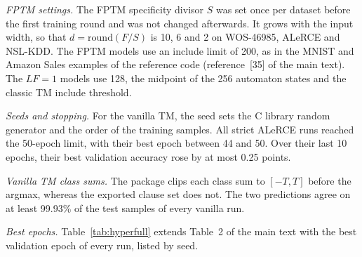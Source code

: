 \documentclass[preprint,12pt]{elsarticle}
\newcommand{\LF}{\mathit{LF}}
\begin{document}
\textit{FPTM settings.} The FPTM specificity divisor $S$ was set once per dataset before the first training round and was not changed afterwards. It grows with the input width, so that $d=\mathrm{round}(F/S)$ is 10, 6 and 2 on WOS-46985, ALeRCE and NSL-KDD.
The FPTM models use an include limit of 200, as in the MNIST and Amazon Sales examples of the reference code (reference~[35] of the main text). The $\LF=1$ models use 128, the midpoint of the 256 automaton states and the classic TM include threshold.

\textit{Seeds and stopping.} For the vanilla TM, the seed sets the C library random generator and the order of the training samples.
All strict ALeRCE runs reached the 50-epoch limit, with their best epoch between 44 and 50. Over their last 10 epochs, their best validation accuracy rose by at most 0.25 points.

\textit{Vanilla TM class sums.} The package clips each class sum to $[-T,T]$ before the argmax, whereas the exported clause set does not. The two predictions agree on at least 99.93\% of the test samples of every vanilla run.

\textit{Best epochs.} Table~\ref{tab:hyperfull} extends Table~2 of the main text with the best validation epoch of every run, listed by seed.
\end{document}
